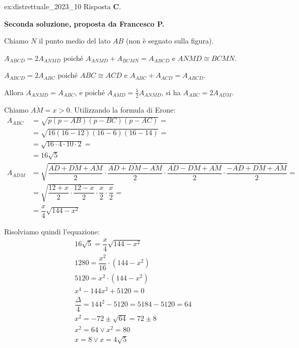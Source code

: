 \begin{soluzione}{ex:distrettuale_2023_10}
    Risposta \textbf{C}.

    \bigskip
    \textbf{Seconda soluzione, proposta da Francesco P.}

    Chiamo $N$ il punto medio del lato $AB$ (non è segnato sulla figura).

    $A_{ABCD} = 2A_{ANMD}$ poiché $A_{ANMD} + A_{BCMN} = A_{ABCD}$ e $ANMD \cong BCMN$.

    $A_{ABCD} = 2A_{ABC}$ poiché $ABC \cong ACD$ e $A_{ABC} + A_{ACD} = A_{ABCD}$.
    
    Allora $A_{ANMD} = A_{ABC}$, e poiché $A_{AMD} = \frac{1}{2}A_{ANMD}$, si ha $A_{ABC} = 2A_{ADM}$.
    
    Chiamo $\overline{AM} = x > 0$.
    Utilizzando la formula di Erone:
    \begin{align*}
        A_{ABC} &= \sqrt {p(p - AB)(p-BC)(p-AC)} = \\
        &= \sqrt{16(16-12)(16-6)(16-14)} = \\
        &= \sqrt {16 \cdot 4 \cdot 10 \cdot 2} = \\
        &= 16 \sqrt {5} \\
        A_{ADM}
        &= \sqrt { \dfrac{\scriptstyle \overline{AD} + \overline{DM} + \overline{AM}}{\scriptstyle 2} \cdot
        \dfrac{\scriptstyle \overline{AD} + \overline{DM} - \overline{AM}}{\scriptstyle 2} \cdot
        \dfrac{\scriptstyle \overline{AD} - \overline{DM} + \overline{AM}}{\scriptstyle 2} \cdot
        \dfrac{\scriptstyle -\overline{AD} + \overline{DM} + \overline{AM}}{\scriptstyle 2}} = \\
        &= \sqrt {\dfrac{12 + x}{2}  \cdot \dfrac{12 - x}{2}  \cdot \dfrac{x}{2}  \cdot \dfrac{x}{2}} = \\
        &= \dfrac{x}{4}\sqrt {144 - x^2}
    \end{align*}

    Risolviamo quindi l'equazione:
    \begin{gather*}
        16 \sqrt {5} = \dfrac{x}{4}\sqrt {144 - x^2} \\
        1280 = \dfrac{x^2}{16} \cdot (144 - x^2) \\
        5120 = x^2 \cdot (144 - x^2) \\
        x^4 - 144 x^2 + 5120 = 0 \\
        \dfrac{\Delta}{4} = 144^2 - 5120 = 5184 - 5120 = 64 \\
        x^2 = -72 \pm \sqrt {64} = 72 \pm 8 \\
        x^2 = 64 \lor x^2 = 80 \\
        x = 8 \lor x = 4\sqrt {5}
    \end{gather*}


\end{soluzione}
